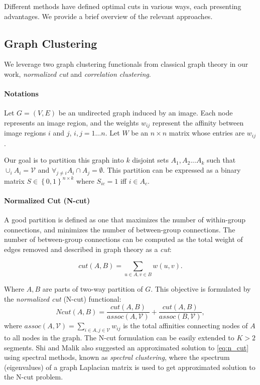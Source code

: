 \documentclass[10pt,twocolumn,letterpaper]{article}
\begin{document}
Different methods have defined optimal cuts in various ways, each presenting advantages. We provide a brief overview of the relevant approaches.

 \subsection{Graph Clustering}\label{c_func}
 We leverage two graph clustering functionals from classical graph theory in our work, \emph{normalized  cut}\cite{shi2000normalized} and \emph{correlation  clustering}\cite{bansal2004correlation}. 
 
\paragraph{Notations}
Let $G = (V,E)$ be an undirected graph induced by an image. Each node represents an image region, and the weights $w_{ij}$ represent the affinity between image regions $i$ and $j$, $i,j=1\ldots n$. Let $W$ be an $n\times n$ matrix whose entries are $w_{ij}$. 

Our goal is to partition this graph into $k$ disjoint sets $A_1, A_2 ... A_k$
such that $\cup_i A_i = \mathcal{V}$ and  $\forall_{j\ne i} A_i \cap A_j = \emptyset$.
This partition can be expressed as a binary matrix $S\in\left\{0,1\right\}^{n\times k}$ where $S_{ic}=1$ iff $i\in A_c$.

\paragraph{Normalized Cut (N-cut)~\cite{shi2000normalized}}
A good partition is defined as one that maximizes the number of within-group
connections, and minimizes the number of between-group connections. The number of between-group connections 
can be computed as the total weight of edges removed and described in graph theory as a \emph{cut}:

\begin{equation}
  cut(A,B) = \sum_{u \in A, v \in B}w(u , v).
  \label{eq:min_cut}
\end{equation}

Where $A, B$ are parts of two-way partition of $G$. This objective is formulated by the \emph{normalized cut} (N-cut) functional:
\begin{equation}
  Ncut(A,B) = \frac{cut(A, B)}{assoc(A,\mathcal{V})} + \frac{cut(A, B)}{assoc(B,\mathcal{V})},
  \label{eq:n_cut}
\end{equation}
where $assoc(A,\mathcal{V})\!=\!\sum_{i \in A, j \in \mathcal{V}} w_{ij}$ is the total affinities connecting nodes of $A$ to all nodes in the graph.
The N-cut formulation can be easily extended to $K>2$ segments. 
Shi and Malik \cite{shi2000normalized} also suggested an approximated solution to \cref{eq:n_cut} using spectral methods, known as \emph{spectral clustering}, where the spectrum (eigenvalues) of a graph Laplacian matrix is used to get approximated solution to the N-cut problem.
\end{document}
